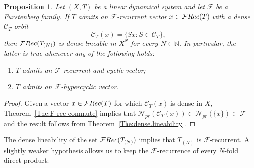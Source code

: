 \documentclass[openright,11pt]{article}
\theoremstyle{plain}
\newtheorem{proposition}[theorem]{Proposition}
\theoremstyle{definition}
\newcommand{\NN}{\mathbb{N}}
\newcommand{\Fc}{\mathcal{F}}
\newcommand{\Nc}{\mathcal{N}}
\newcommand{\Rec}{\textup{Rec}}
\newcommand{\Com}{\mathcal{C}}
\newcommand{\cl}{\overline}
\begin{document}
\begin{proposition}\label{Pro:dense.lineability}
	Let $(X,T)$ be a linear dynamical system and let $\Fc$ be a Furstenberg family. If $T$ admits an $\Fc$-recurrent vector $x \in \Fc\Rec(T)$ with a dense $\Com_T$-orbit
	\[
	\Com_T(x) = \{Sx : S \in \Com_T \},
	\]%
	then $\Fc\Rec(T_{(N)})$ is dense lineable in $X^N$ for every $N \in \NN$. In particular, the latter is true whenever any of the following holds:
	\begin{enumerate}[--]
		\item $T$ admits an $\Fc$-recurrent and cyclic vector;
		
		\item $T$ admits an $\Fc$-hypercyclic vector.
	\end{enumerate}
\end{proposition}
\begin{proof}
	Given a vector $x \in \Fc\Rec(T)$ for which $\Com_T(x)$ is dense in $X$, Theorem~\ref{The:F-rec-commute} implies that $\Nc_{pr}(\Com_T(x)) \subset \Nc_{pr}(\{x\}) \subset \Fc$ and the result follows from Theorem~\ref{The:dense.lineability}.
\end{proof}

The dense lineability of the set $\Fc\Rec(T_{(N)})$ implies that $T_{(N)}$ is $\Fc$-recurrent. A slightly weaker hypothesis allows us to keep the $\Fc$-recurrence of every $N$-fold direct product:
\end{document}
